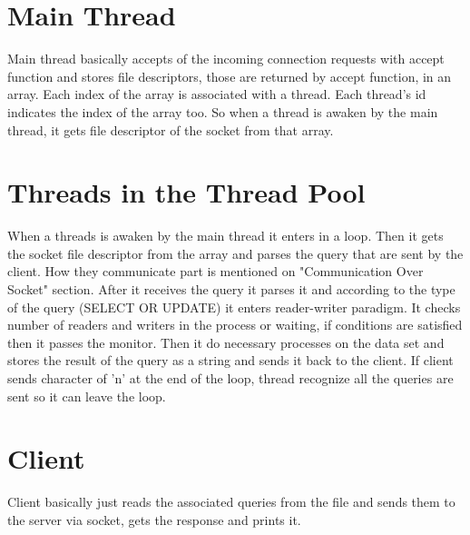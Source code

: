 \documentclass{article}
\begin{document}
{\parindent}\section{Main Thread}
\par\hspace{\parindent} Main thread basically accepts of the incoming connection requests with accept function and stores file descriptors, those are returned by accept function, in an array. Each index of the array is associated with a thread. Each thread's id indicates the index of the array too. So when a thread is awaken by the main thread, it gets file descriptor of the socket from that array.
{\parindent}\section{Threads in the Thread Pool}
\par\hspace{\parindent} When a threads is awaken by the main thread it enters in a loop. Then it gets the socket file descriptor from the array and parses the query that are sent by the client. How they communicate part is mentioned on "Communication Over Socket" section. After it receives the query it parses it and according to the type of the query (SELECT OR UPDATE) it enters reader-writer paradigm. It checks number of readers and writers in the process or waiting, if conditions are satisfied then it passes the monitor. Then it do necessary processes on the data set and stores the result of the query as a string and sends it back to the client. If client sends character of 'n' at the end of the loop, thread recognize all the queries are sent so it can leave the loop.  
{\parindent}\section{Client}
\par\hspace{\parindent} Client basically just reads the associated queries from the file and sends them to the server via socket, gets the response and prints it.  
\end{document}
